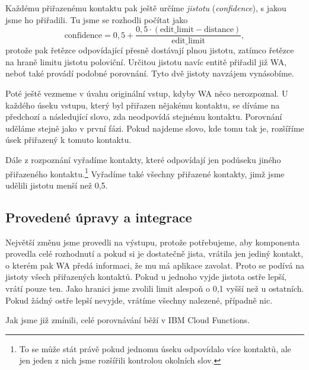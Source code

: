 Každému přiřazenému kontaktu pak ještě určíme \textit{jistotu} (\textit{confidence}),
s jakou jsme ho přiřadili. Tu jsme se rozhodli počítat jako
\[ \text{confidence} = 0,5 + \frac{0,5 \cdot (\text{edit\_limit} - \text{distance})}{\text{edit\_limit}} ,\]
protože pak řetězce odpovídající přesně dostávají plnou jistotu, zatímco řetězce na
hraně limitu jistotu poloviční. Určitou jistotu navíc entitě přiřadil již WA,
neboť také provádí podobné porovnání. Tyto dvě jistoty navzájem vynásobíme.

Poté ještě vezmeme v úvahu originální vstup, kdyby WA něco nerozpoznal. U každého
úseku vstupu, který byl přiřazen nějakému kontaktu, se díváme na předchozí a následující
slovo, zda neodpovídá stejnému kontaktu. Porovnání uděláme stejně jako v první fázi.
Pokud najdeme slovo, kde tomu tak je, rozšíříme úsek přiřazený k tomuto kontaktu.

Dále z rozpoznání vyřadíme kontakty, které odpovídají jen podúseku jiného
přiřazeného kontaktu.\footnote{To se může stát právě pokud jednomu úseku odpovídalo více
    kontaktů, ale jen jeden z nich jsme rozšířili kontrolou okolních slov.} Vyřadíme také
všechny přiřazené kontakty, jimž jsme udělili jistotu menší než 0,5.

\subsection{Provedené úpravy a integrace}

Největší změnu jsme provedli na výstupu, protože potřebujeme, aby komponenta provedla
celé rozhodnutí a pokud si je dostatečně jista, vrátila jen jediný kontakt,
o kterém pak WA předá informaci, že mu má aplikace zavolat. Proto
se podívá na jistoty všech přiřazených kontaktů. Pokud u jednoho
vyjde jistota ostře lepší, vrátí pouze ten. Jako hranici
 jsme zvolili limit alespoň o 0,1 vyšší než u
ostatních. Pokud žádný ostře lepší nevyjde, vrátíme všechny
nalezené, případně nic.

Jak jsme již zmínili, celé porovnávání běží v IBM Cloud Functions.